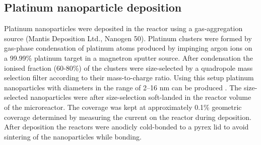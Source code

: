 \documentclass[8.5pt,twoside,twocolumn]{article}
\begin{document}
\subsection{Platinum nanoparticle deposition}
Platinum nanoparticles were deposited in the reactor using a gas-aggregation source (Mantis Deposition Ltd., Nanogen 50). Platinum clusters were formed by gas-phase condensation of platinum atoms produced by impinging argon ions on a 99.99\% platinum target in a magnetron sputter source. After condensation the ionised fraction (60-80\%) of the clusters were size-selected by a quadropole mass selection filter according to their mass-to-charge ratio. Using this setup platinum nanoparticles with diameters in the range of 2–16 nm can be produced \cite{Nielsen2010,Nielsen2009}. The size-selected nanoparticles were after size-selection soft-landed in the reactor volume of the microreactor. The coverage was kept at approximately 0.1\% geometric coverage determined by measuring the current on the reactor during deposition. After deposition the reactors were anodicly cold-bonded \cite{Vesborg2010} to a pyrex lid to avoid sintering of the nanoparticles while bonding.
\end{document}

